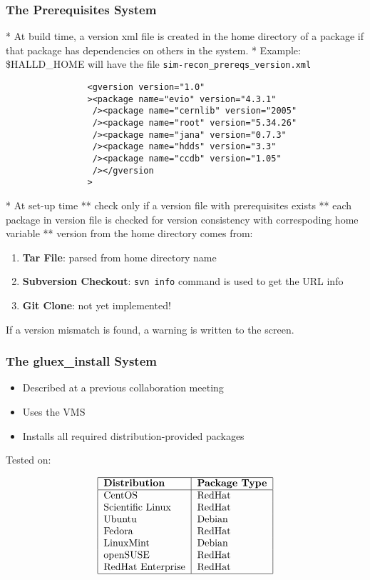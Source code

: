 \documentclass[xcolor=dvipsnames,hyperref={pdfpagelabels=false}]{beamer}
\begin{document}
\begin{frame}[fragile]
  \frametitle{The Prerequisites System}\label{section:prerequisites-system}

* At build time, a version xml file is created in the home directory of
a package if that package has dependencies on others in the
system.
* Example: \$HALLD\_HOME will have the file {\tt sim-recon\_prereqs\_version.xml}

\begin{verbatim}
                <gversion version="1.0"
                ><package name="evio" version="4.3.1"
                 /><package name="cernlib" version="2005"
                 /><package name="root" version="5.34.26"
                 /><package name="jana" version="0.7.3"
                 /><package name="hdds" version="3.3"
                 /><package name="ccdb" version="1.05"
                 /></gversion
                >
\end{verbatim}

* At set-up time
** check only if a version file with prerequisites exists
** each package in version file is checked for version consistency with correspoding home variable
** version from the home directory comes from:
\begin{enumerate}
\item {\bf Tar File}: parsed from home directory name
\item {\bf Subversion Checkout}: {\tt svn info} command is used to get the URL info
\item {\bf Git Clone}: not yet implemented!
\end{enumerate}
If a version mismatch is found, a warning is written to the screen.

\end{frame}

\begin{frame}
  \frametitle{The gluex\_install System}

\begin{itemize}
\item Described at a previous collaboration meeting
\item Uses the VMS
\item Installs all required distribution-provided packages
\end{itemize}

Tested on:

\begin{table}
$$
\begin{tabular}{|l|l|}
\hline
\bf Distribution & \bf Package Type \\
\hline
CentOS & RedHat \\
Scientific Linux & RedHat \\
Ubuntu & Debian \\
Fedora & RedHat \\
LinuxMint & Debian \\
openSUSE & RedHat \\
RedHat Enterprise & RedHat \\
\hline
\end{tabular}
$$
\end{table}

\end{frame}
\end{document}
